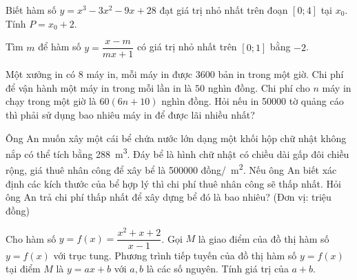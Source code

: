 \begin{baitap}
	Biết hàm số $y = x^3 - 3x^2 - 9x + 28$ đạt giá trị nhỏ nhất trên đoạn $[0; 4]$ tại $x_0$. Tính $P = x_0 + 2$.
\end{baitap}

\begin{baitap}
	Tìm $m$ để hàm số $y = \dfrac{x - m}{mx + 1}$ có giá trị nhỏ nhất trên $[0; 1]$ bằng $-2$.
\end{baitap}

\begin{baitap}
	Một xưởng in có $8$ máy in, mỗi máy in được \num{3600} bản in trong một giờ. Chi phí để vận hành một máy in trong mỗi lần in là $50$ nghìn đồng. Chi phí cho $n$ máy in chạy trong một giờ là $60(6n + 10)$ nghìn đồng. Hỏi nếu in \num{50000} tờ quảng cáo thì phải sử dụng bao nhiêu máy in để được lãi nhiều nhất?
\end{baitap}

\begin{baitap}
	Ông An muốn xây một cái bể chứa nước lớn dạng một khối hộp chữ nhật không nắp có thể tích bằng \SI{288}{\cubic\meter}. Đáy bể là hình chữ nhật có chiều dài gấp đôi chiều rộng, giá thuê nhân công để xây bể là \num{500000} đồng/\SI{}{\square\meter}. Nếu ông An biết xác định các kích thước của bể hợp lý thì chi phí thuê nhân công sẽ thấp nhất. Hỏi ông An trả chi phí thấp nhất để xây dựng bể đó là bao nhiêu? (Đơn vị: triệu đồng)
\end{baitap}

\begin{baitap}
	Cho hàm số $y = f(x) = \dfrac{x^2 + x + 2}{x - 1}$. Gọi $M$ là giao điểm của đồ thị hàm số $y = f(x)$ với trục tung. Phương trình tiếp tuyến của đồ thị hàm số $y = f(x)$ tại điểm $M$ là $y = ax +b$ với $ a,b $ là các số nguyên. Tính giá trị của $ a+b.$
\end{baitap}

